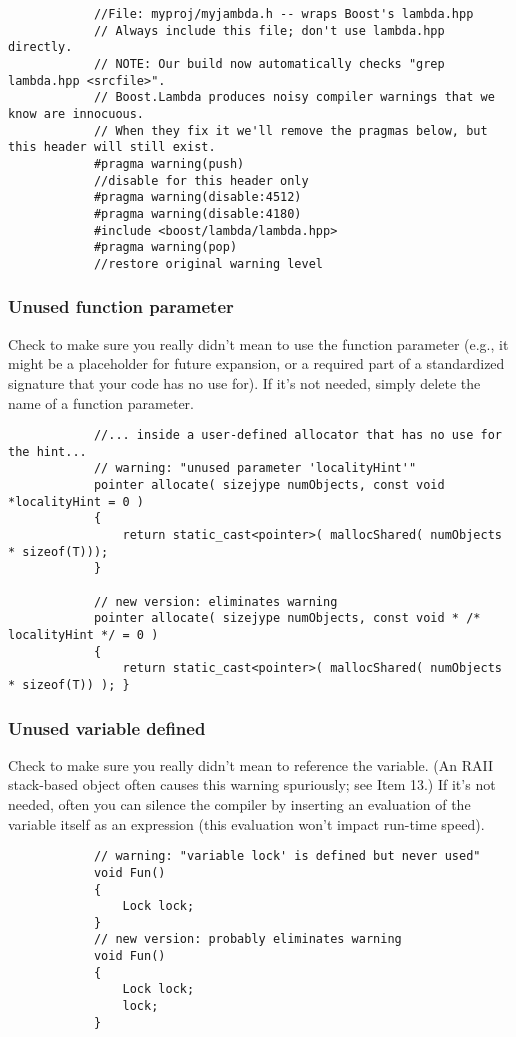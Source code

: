 \documentclass[12pt,a4paper,oneside]{article}
\begin{document}
			\begin{verbatim}
			//File: myproj/myjambda.h -- wraps Boost's lambda.hpp
			// Always include this file; don't use lambda.hpp directly.
			// NOTE: Our build now automatically checks "grep lambda.hpp <srcfile>".
			// Boost.Lambda produces noisy compiler warnings that we know are innocuous.
			// When they fix it we'll remove the pragmas below, but this header will still exist.
			#pragma warning(push)
			//disable for this header only
			#pragma warning(disable:4512)
			#pragma warning(disable:4180)
			#include <boost/lambda/lambda.hpp> 
			#pragma warning(pop)
			//restore original warning level
			\end{verbatim}
			\subsubsection{Unused function parameter}
			Check to make sure you really didn't mean to use the function parameter (e.g., it might be a placeholder for future expansion, or a required part of a standardized signature that your code has no use for). If it's not needed, simply delete the name of a function parameter.
			\begin{verbatim}
			//... inside a user-defined allocator that has no use for the hint...
			// warning: "unused parameter 'localityHint'"
			pointer allocate( sizejype numObjects, const void *localityHint = 0 )
			{ 
				return static_cast<pointer>( mallocShared( numObjects * sizeof(T))); 
			}
			
			// new version: eliminates warning
			pointer allocate( sizejype numObjects, const void * /* localityHint */ = 0 ) 
			{
				return static_cast<pointer>( mallocShared( numObjects * sizeof(T)) ); }
			\end{verbatim}
			\subsubsection{Unused variable defined}
			Check to make sure you really didn't mean to reference the variable. (An RAII stack-based object often causes this warning spuriously; see Item 13.) If it's not needed, often you can silence the compiler by	inserting an evaluation of the variable itself as an expression (this evaluation won't impact run-time speed).
			\begin{verbatim}
			// warning: "variable lock' is defined but never used"
			void Fun() 
			{ 
				Lock lock;
			}
			// new version: probably eliminates warning
			void Fun() 
			{
				Lock lock;
				lock;
			}
			\end{verbatim}
			
\end{document}
